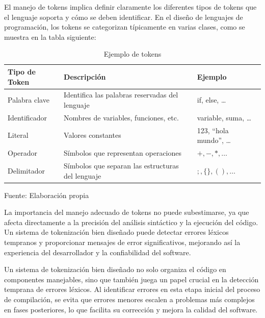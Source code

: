 El manejo de tokens implica definir claramente los diferentes tipos de tokens que el lenguaje soporta y cómo se deben identificar. En el diseño de lenguajes de programación, los tokens se categorizan típicamente en varias clases, como se muestra en la tabla siguiente:

\begin{table}
  \begin{center}
    \begin{tabularx}{0.8\textwidth}{|X|X|X|}
      \hline
      \textbf{Tipo de Token} & \textbf{Descripción} & \textbf{Ejemplo} \\
      \hline
      Palabra clave & Identifica las palabras reservadas del lenguaje & if, else, … \\
      \hline
      Identificador & Nombres de variables, funciones, etc. & variable, suma, … \\
      \hline
      Literal & Valores constantes & 123, “hola mundo”, … \\
      \hline
      Operador & Símbolos que representan operaciones & $+, -, *, … $\\
      \hline
      Delimitador & Símbolos que separan las estructuras del lenguaje & $;, \{\}, (), …$ \\
      \hline
    \end{tabularx}
  \end{center}
  \caption{Ejemplo de tokens}
  \centering Fuente: Elaboración propia
  \label{tab:tokens}
\end{table}

La importancia del manejo adecuado de tokens no puede subestimarse, ya que afecta directamente a la precisión del análisis sintáctico y la ejecución del código. Un sistema de tokenización bien diseñado puede detectar errores léxicos tempranos y proporcionar mensajes de error significativos, mejorando así la experiencia del desarrollador y la confiabilidad del software.

Un sistema de tokenización bien diseñado no solo organiza el código en componentes manejables, sino que también juega un papel crucial en la detección temprana de errores léxicos. Al identificar errores en esta etapa inicial del proceso de compilación, se evita que errores menores escalen a problemas más complejos en fases posteriores, lo que facilita su corrección y mejora la calidad del software. \parencite{Jeffery2021}

